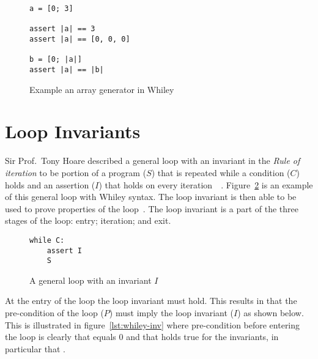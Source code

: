 \begin{figure}[ht]
\begin{lstlisting}
a = [0; 3]

assert |a| == 3
assert |a| == [0, 0, 0]

b = [0; |a|]
assert |a| == |b|
\end{lstlisting}
    \caption{Example an array generator in Whiley}
    \label{lst:whiley-array-gen}
\end{figure}

\section{Loop Invariants}

Sir Prof.\ Tony Hoare described a general loop with an invariant in
the \textit{Rule of iteration} to be
portion of a program ($S$) that is repeated while a condition ($C$)
holds and an assertion ($I$) that holds on every
iteration~\cite{hoare-logic}~\cite{loop-inv-survey}.
Figure~\ref{lst:general-loop} is an example of this general loop with Whiley
syntax.
The loop invariant is then able to be used to prove properties of the
loop~\cite{loop-inv-survey}.
The loop invariant is a part of the three stages of the loop: entry;
iteration; and exit.

\begin{figure}[ht]
\begin{lstlisting}
while C:
    assert I
    S
\end{lstlisting}
    \caption{A general loop with an invariant $I$}
    \label{lst:general-loop}
\end{figure}

At the entry of the loop the loop invariant must hold.
This results in that the pre-condition of the loop ($P$) must imply
the loop invariant ($I$) as shown below.
This is illustrated in figure~\ref{lst:whiley-inv} where pre-condition
before entering the loop is clearly that  equals 0 and that holds
true for the invariants, in particular that .

